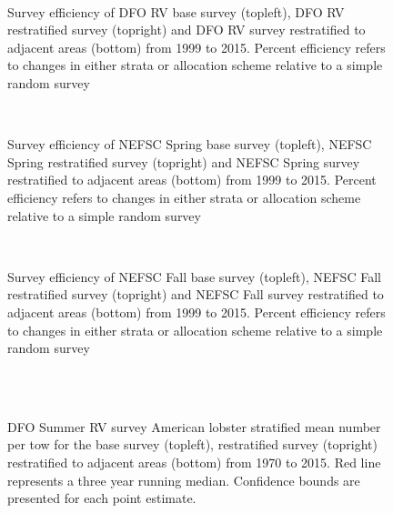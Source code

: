 \documentclass[11pt]{article}
\newcommand{\e}{/backup/bio_data/bio.lobster/figures/} %
\begin{document}


\begin{figure}
\centering
{}
\\
\caption{Survey efficiency of DFO RV base survey (topleft), DFO RV restratified survey (topright) and DFO RV survey restratified to adjacent areas (bottom) from 1999 to 2015. Percent efficiency refers to changes in either strata or allocation scheme relative to a simple random survey }
\end{figure}
\clearpage



\begin{figure}
\centering
{}
\\
\caption{Survey efficiency of NEFSC Spring base survey (topleft), NEFSC Spring restratified survey (topright) and NEFSC Spring survey restratified to adjacent areas (bottom) from 1999 to 2015. Percent efficiency refers to changes in either strata or allocation scheme relative to a simple random survey }
\end{figure}
\clearpage


\begin{figure}
\centering
{}
\\
\caption{Survey efficiency of NEFSC Fall base survey (topleft), NEFSC Fall restratified survey (topright) and NEFSC Fall survey restratified to adjacent areas (bottom) from 1999 to 2015. Percent efficiency refers to changes in either strata or allocation scheme relative to a simple random survey }
\end{figure}
\clearpage

\begin{figure}
\centering
{}
\\
\\

\caption{DFO Summer RV survey American lobster stratified mean number per tow for the base survey (topleft), restratified survey (topright) restratified to adjacent areas (bottom) from 1970 to 2015. Red line represents a three year running median. Confidence bounds are presented for each point estimate. }
\end{figure}
\clearpage
\end{document}
